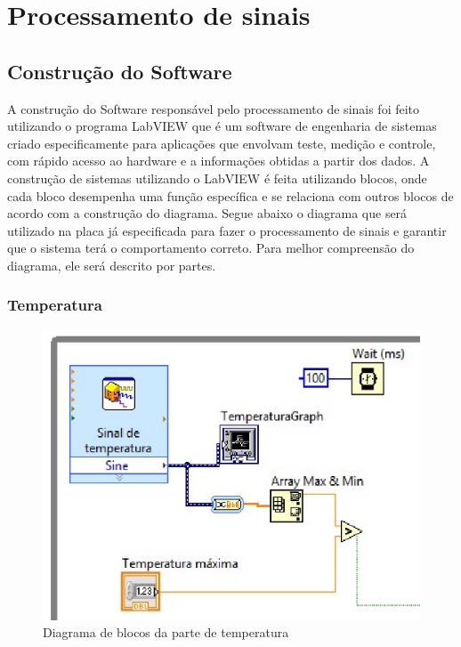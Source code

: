 \newpage
\section{Processamento de sinais}


\subsection{Construção do Software}

A construção do Software responsável pelo processamento de sinais foi feito utilizando o programa LabVIEW que é um software de engenharia de sistemas criado especificamente para aplicações que envolvam teste, medição e controle, com rápido acesso ao hardware e a informações obtidas a partir dos dados.
A construção de sistemas utilizando o LabVIEW é feita utilizando blocos, onde cada bloco desempenha uma função específica e se relaciona com outros blocos de acordo com a construção do diagrama.
Segue abaixo o diagrama que será utilizado na placa já especificada para fazer o processamento de sinais e garantir que o sistema terá o comportamento correto. Para melhor compreensão do diagrama, ele será descrito por partes.

\subsubsection{Temperatura}

\begin{figure}[!htb]                                                             
    \centering                                                                      
    \includegraphics[scale=0.6, keepaspectratio=true]{figuras/detalhado/temp_labview.eps} 
    \caption{Diagrama de blocos da parte de temperatura}\label{temp1}
 \end{figure}

